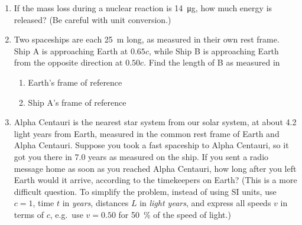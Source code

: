 \begin{enumerate}[itemsep=6pt]
\item If the mass loss during a nuclear reaction is \SI{14}{\micro\gram},
  how much energy is released? (Be careful with unit conversion.)
 
  
\item Two spaceships are each \SI{25}{\metre} long, as measured in their own
  rest frame. Ship A is approaching Earth at $0.65c$, while Ship B is
  approaching Earth from the opposite direction at $0.50c$. Find the length of
  B as measured in
  \begin{enumerate}[itemsep=3pt]
  \item Earth's frame of reference
  \item Ship A's frame of reference
  \end{enumerate}

\item Alpha Centauri is the nearest star system from our solar system, at
  about 4.2 light years from Earth, measured in the common rest frame of Earth
  and Alpha Centauri. Suppose you took a fast spaceship to Alpha Centauri, so
  it got you there in 7.0 years as measured on the ship. If you sent a radio
  message home as soon as you reached Alpha Centauri, how long after you left
  Earth would it arrive, according to the timekeepers on Earth? (This is a
  more difficult question. To simplify the problem, instead of using SI units,
  use $c=1$, time $t$ in \emph{years}, distances $L$ in \emph{light years}, and
  express all speeds $v$ in terms of $c$, e.g.\ use $v=0.50$ for
  \SI{50}{\percent} of the speed of light.)
\end{enumerate}
